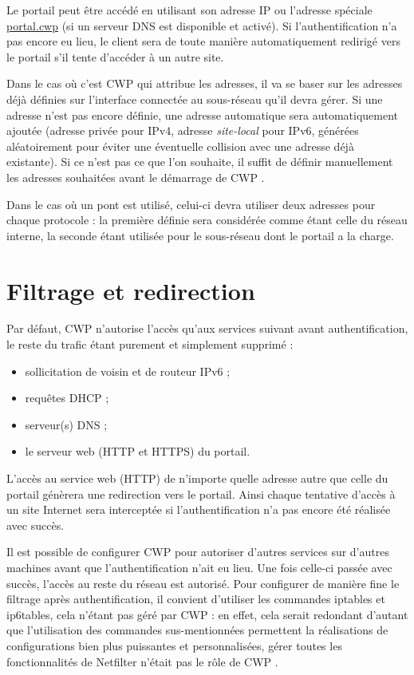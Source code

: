 \documentclass[a4paper,11pt]{report}
\newcommand{\ensp}[1]{\selectlanguage{english}#1\selectlanguage{french}}
\newcommand{\file}[1]{\ensp{\textsf{#1}}}
\newcommand{\func}[1]{\ensp{\textsf{#1}}}
\newcommand{\cwp}{%
  CWP%
}
\newcommand{\portalurl}{portal.cwp}
\newcommand{\portal}{\href{http://\portalurl/}{\ensp{\file{\portalurl}}}}
\begin{document}
Le portail peut être accédé en utilisant son adresse IP ou l'adresse spéciale
\portal{} (si un serveur DNS est disponible et activé). Si l'authentification
n'a pas encore eu lieu, le client sera de toute manière automatiquement
redirigé vers le portail s'il tente d'accéder à un autre site.

Dans le cas où c'est \cwp{} qui attribue les adresses, il va se baser sur les
adresses déjà définies sur l'interface connectée au sous-réseau qu'il devra
gérer. Si une adresse n'est pas encore définie, une adresse automatique sera
automatiquement ajoutée (adresse privée pour IPv4, adresse \emph{site-local}
pour IPv6, générées aléatoirement pour éviter une éventuelle collision avec
une adresse déjà existante). Si ce n'est pas ce que l'on souhaite, il suffit
de définir manuellement les adresses souhaitées avant le démarrage de \cwp.

Dans le cas où un pont est utilisé, celui-ci devra utiliser deux adresses pour
chaque protocole : la première définie sera considérée comme étant celle du
réseau interne, la seconde étant utilisée pour le sous-réseau dont le portail
a la charge.

\section{Filtrage et redirection}

Par défaut, \cwp{} n'autorise l'accès qu'aux services suivant avant
authentification, le reste du trafic étant purement et simplement supprimé :
\begin{itemize}
  \item sollicitation de voisin et de routeur IPv6 ;
  \item requêtes DHCP ;
  \item serveur(s) DNS ;
  \item le serveur web (HTTP et HTTPS) du portail.
\end{itemize}\medskip

L'accès au service web (HTTP) de n'importe quelle adresse autre que celle du
portail génèrera une redirection vers le portail. Ainsi chaque tentative
d'accès à un site Internet sera interceptée si l'authentification n'a pas
encore été réalisée avec succès.

Il est possible de configurer \cwp{} pour autoriser d'autres services sur
d'autres machines avant que l'authentification n'ait eu lieu. Une fois
celle-ci passée avec succès, l'accès au reste du réseau est autorisé. Pour
configurer de manière fine le filtrage après authentification, il convient
d'utiliser les commandes \func{iptables} et \func{ip6tables}, cela n'étant pas
géré par \cwp{} : en effet, cela serait redondant d'autant que l'utilisation
des commandes sus-mentionnées permettent la réalisations de configurations
bien plus puissantes et personnalisées, gérer toutes les fonctionnalités de
Netfilter n'était pas le rôle de \cwp.
\end{document}
